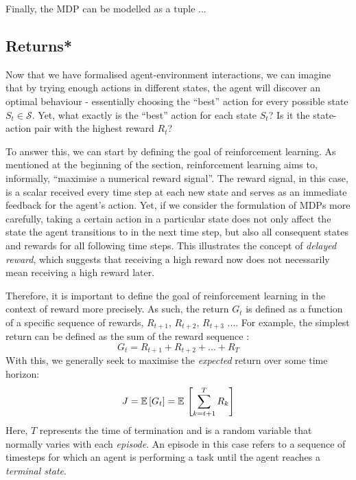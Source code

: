 Finally, the MDP can be modelled as a tuple ... 


\subsection{Returns*}
\label{subsec:2_returns}

Now that we have formalised agent-environment interactions, we can imagine that by trying enough actions in different states, the agent will discover an optimal behaviour - essentially choosing the ``best'' action for every possible state $S_t \in \mathcal{S}$. Yet, what exactly is the ``best'' action for each state $S_t$? Is it the state-action pair with the highest reward $R_t$? 

To answer this, we can start by defining the goal of reinforcement learning. As mentioned at the beginning of the section, reinforcement learning aims to, informally, “maximise a numerical reward signal”. The reward signal, in this case, is a scalar received every time step at each new state and serves as an immediate feedback for the agent's action. Yet, if we consider the formulation of MDPs more carefully, taking a certain action in a particular state does not only affect the state the agent transitions to in the next time step, but also all consequent states and rewards for all following time steps. This illustrates the concept of \textit{delayed reward}, which suggests that receiving a high reward now does not necessarily mean receiving a high reward later.

Therefore, it is important to define the goal of reinforcement learning in the context of reward more precisely. As such, the return $G_t$ is defined as a function of a specific sequence of rewards, $R_{t+1}$, $R_{t+2}$, $R_{t+3}$ .... For example, the simplest return can be defined as the sum of the reward sequence \cite{suttonAndBartoBook}:
\begin{equation}
    G_t = R_{t+1} + R_{t+2} + ... + R_{T}
\end{equation}
With this, we generally seek to maximise the \textit{expected} return over some time horizon:
\begin{equation}
    J = \mathbb{E} \, [G_t] = \mathbb{E} \, \left[ 
    \sum^{T}_{k = t+1} R_k
    \right]
\end{equation}
Here, $T$ represents the time of termination and is a random variable that normally varies with each \textit{episode}. An episode in this case refers to a sequence of timesteps for which an agent is performing a task until the agent reaches a \textit{terminal state}. 

